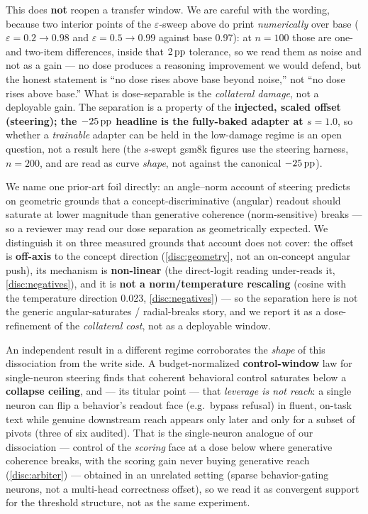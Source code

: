 This does \textbf{not} reopen a transfer window. We are careful with the wording,
because two interior points of the $\varepsilon$-sweep above do print
\emph{numerically} over base ($\varepsilon{=}0.2 \rightarrow 0.98$ and
$\varepsilon{=}0.5 \rightarrow 0.99$ against base 0.97): at $n{=}100$ those are
one- and two-item differences, inside that $2\,\mathrm{pp}$ tolerance, so we read
them as noise and not as a gain --- no dose produces a reasoning improvement we
would defend, but the honest statement is ``no dose rises above base beyond
noise,'' not ``no dose rises above base.'' What is dose-separable is the
\emph{collateral damage}, not a deployable gain. The separation is a property of
the \textbf{injected, scaled offset (steering); the $-25\,\mathrm{pp}$ headline is the
fully-baked adapter at $s{=}1.0$}, so whether a \emph{trainable} adapter can be
held in the low-damage regime is an open question, not a result here (the
$s$-swept gsm8k figures use the steering harness, $n{=}200$, and are read as curve
\emph{shape}, not against the canonical $-25\,\mathrm{pp}$).

We name one prior-art foil directly: an angle--norm account of steering
\citep{AngleNorm} predicts on geometric grounds that a concept-discriminative
(angular) readout should saturate at lower magnitude than generative coherence
(norm-sensitive) breaks --- so a reviewer may read our dose separation as
geometrically expected. We distinguish it on three measured grounds that account
does not cover: the offset is \textbf{off-axis} to the concept direction
(\cref{disc:geometry}, not an on-concept angular push), its mechanism is
\textbf{non-linear} (the direct-logit reading under-reads it,
\cref{disc:negatives}), and it is \textbf{not a norm/temperature rescaling}
(cosine with the temperature direction 0.023, \cref{disc:negatives}) --- so the
separation here is not the generic angular-saturates / radial-breaks story, and we
report it as a dose-refinement of the \emph{collateral cost}, not as a deployable
window.

An independent result in a different regime corroborates the \emph{shape} of this
dissociation from the write side. A budget-normalized \textbf{control-window} law
for single-neuron steering \citep{LeverageIsNotReach} finds that coherent
behavioral control saturates below a \textbf{collapse ceiling}, and --- its titular
point --- that \emph{leverage is not reach}: a single neuron can flip a behavior's
readout face (e.g.\ bypass refusal) in fluent, on-task text while genuine
downstream reach appears only later and only for a subset of pivots (three of six
audited). That is the single-neuron analogue of our dissociation --- control of the
\emph{scoring} face at a dose below where generative coherence breaks, with the
scoring gain never buying generative reach (\cref{disc:arbiter}) --- obtained in an
unrelated setting (sparse behavior-gating neurons, not a multi-head correctness
offset), so we read it as convergent support for the threshold structure, not as
the same experiment.

